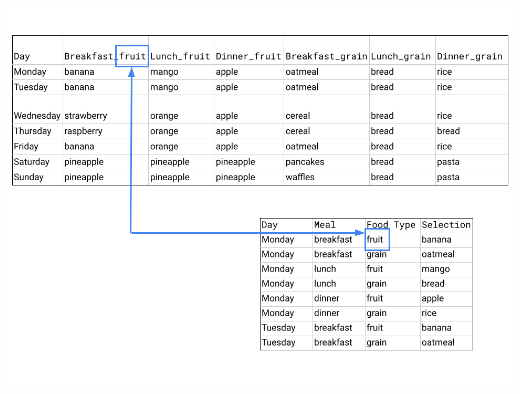\documentclass[
]{book}
\begin{document}
\includegraphics{images/M2S2_image2_long_vs_wide_format.png}
\end{document}
